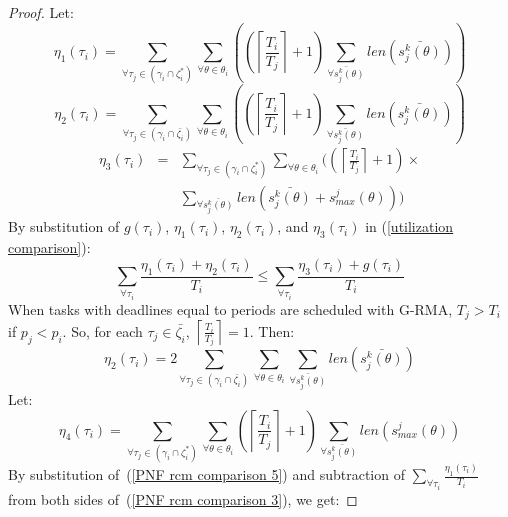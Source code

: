\documentclass[a4paper,english]{article}
\newtheorem{proof}{Proof}
\begin{document}
\begin{proof}
Let:
%
\begin{equation*}
\eta_{1}(\tau_{i})=\sum_{\forall\tau_{j}\in(\gamma_{i}\cap\zeta_{i}^{*})}\sum_{\forall\theta\in\theta_{i}}\left(\left(\left\lceil \frac{T_{i}}{T_{j}}\right\rceil +1\right)\sum_{\bar{\forall s_{j}^{k}(\theta)}}len\left(\bar{s_{j}^{k}(\theta)}\right)\right)
\end{equation*}
%
\begin{equation*}
\eta_{2}(\tau_{i})=\sum_{\forall\tau_{j}\in(\gamma_{i}\cap\bar{\zeta_{i}})}\sum_{\forall\theta\in\theta_{i}}\left(\left(\left\lceil \frac{T_{i}}{T_{j}}\right\rceil +1\right)\sum_{\bar{\forall s_{j}^{k}(\theta)}}len\left(\bar{s_{j}^{k}(\theta)}\right)\right)
\end{equation*}
%
%
\begin{eqnarray*}
\eta_{3}(\tau_{i}) & = & \sum_{\forall\tau_{j}\in(\gamma_{i}\cap\zeta_{i}^{*})}\sum_{\forall\theta\in\theta_{i}}\Bigg(\left(\left\lceil \frac{T_{i}}{T_{j}}\right\rceil +1\right)\times\\
 &  & \sum_{\forall\bar{s_{j}^{k}(\theta)}}len\left(\bar{s_{j}^{k}(\theta)}+s_{max}^{j}(\theta)\right)\Bigg)
\end{eqnarray*}
%
By substitution of $g(\tau_i)$, $\eta_1(\tau_i)$, $\eta_2(\tau_i)$, and $\eta_3(\tau_i)$ in (\ref{utilization comparison}):
%
\begin{equation}
\sum_{\forall\tau_{i}}\frac{\eta_{1}(\tau_{i})+\eta_{2}(\tau_{i})}{T_{i}}\le\sum_{\forall\tau_{i}}\frac{\eta_{3}(\tau_{i})+g(\tau_{i})}{T_{i}}
\label{PNF rcm comparison 3}
\end{equation}
%
When tasks with deadlines equal to periods are scheduled with G-RMA, $T_{j}>T_{i}$ if $p_{j}<p_{i}$. So, for each $\tau_{j}\in\bar{\zeta_{i}}$, $\left\lceil \frac{T_{i}}{T_{j}}\right\rceil =1$. Then:
%
\begin{equation}
\eta_{2}(\tau_{i})=2\sum_{\forall\tau_{j}\in(\gamma_{i}\cap\bar{\zeta_{i}})}\sum_{\forall\theta\in\theta_{i}}\sum_{\bar{\forall s_{j}^{k}(\theta)}}len\left(\bar{s_{j}^{k}(\theta)}\right)
\label{PNF rcm comparison 5}
\end{equation}
%
Let:
%
\begin{equation*}
\eta_{4}(\tau_{i})=\sum_{\forall\tau_{j}\in(\gamma_{i}\cap\zeta_{i}^{*})}\sum_{\forall\theta\in\theta_{i}}\left(\left\lceil \frac{T_{i}}{T_{j}}\right\rceil +1\right)\sum_{\forall\bar{s_{j}^{k}(\theta)}}len\left(s_{max}^{j}(\theta)\right)
\end{equation*}
%
By substitution of~(\ref{PNF rcm comparison 5}) and subtraction of $\sum_{\forall \tau_i} \frac{\eta_1 (\tau_i)}{T_i}$ from both sides of~(\ref{PNF rcm comparison 3}), we get:

\end{proof}
\end{document}
